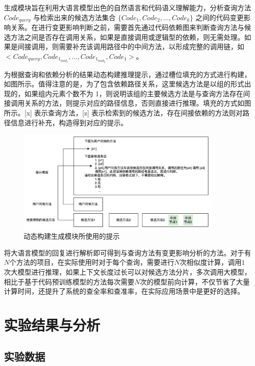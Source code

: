 生成模块旨在利用大语言模型出色的自然语言和代码语义理解能力，分析查询方法 $Code_{query}$ 与检索出来的候选方法集合 $\{Code_1, Code_2, ..., Code_k\}$ 之间的代码变更影响关系。在进行变更影响判断之前，需要首先通过代码依赖图来判断查询方法与候选方法之间是否存在调用关系，如果是直接调用或逻辑型的依赖，则无需处理。如果是间接调用，则需要补充该调用路径中的中间方法，以形成完整的调用链，如$<Code_{query},Code_{1_{mid_1}},...,Code_{1_{mid_2}},Code_1>$。

为根据查询和依赖分析的结果动态构建推理提示，通过槽位填充的方式进行构建，如图\label{2_推理prompt}所示。值得注意的是，为了包含依赖路径关系，这里候选方法是以组的形式出现的，如果组内元素个数不为 1，则说明该组的主要候选方法是与查询方法存在间接调用关系的方法，则提示对应的路径信息，否则直接进行推理。填充的方式如图所示。[x] 表示查询方法，[z] 表示检索到的候选方法，存在间接依赖的方法则对路径信息进行补充，构造得到对应的提示。

\begin{figure}[htbp]
\centering
\includegraphics[width = 0.9\textwidth]{figures/提示词填充.jpg}
\caption{动态构建生成模块所使用的提示}
\label{2_推理prompt}
\end{figure}


将大语言模型的回复进行解析即可得到与查询方法有变更影响分析的方法。对于有$N$个方法的项目，在实际使用时对于每个查询，需要进行$N$次相似度计算，调用$1$次大模型进行推理，如果上下文长度过长可以对候选方法分片，多次调用大模型，相比于基于代码预训练模型的方法每次需要$N$次的模型前向计算，不仅节省了大量计算时间，还提升了系统的查全率和查准率，在实际应用场景中是更好的选择。


\section{实验结果与分析}

\subsection{实验数据}


